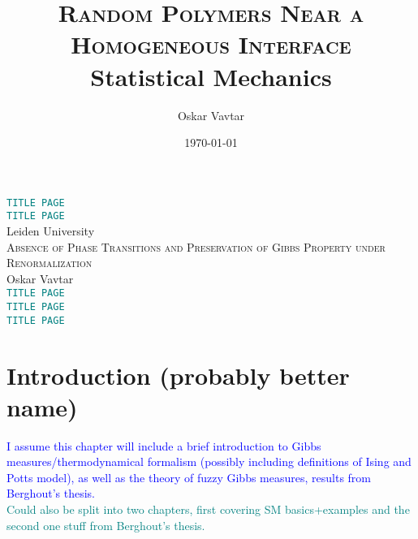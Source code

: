 \documentclass[12pt]{article}
\title{\textsc{Random Polymers Near a Homogeneous Interface}\\\vspace{0.3cm}\small{Statistical Mechanics}\vspace{-0.7cm}}
\author{Oskar Vavtar}
\date{\today}
\newcommand{\1}{\mathbbm{1}}
\newcommand{\5}{\vspace{0.5cm}}
\theoremstyle{definition}
\begin{document}
\begin{center}
\Huge{\textcolor{teal}{\texttt{TITLE PAGE}}} \\
\vspace{2cm}
\Huge{\textcolor{teal}{\texttt{TITLE PAGE}}} \\
\vspace{2cm}
Leiden University \\
\vspace{2cm}
{\textsc{Absence of Phase Transitions and Preservation of Gibbs Property under Renormalization}} \\
\vspace{2cm}
Oskar Vavtar \\
\vspace{2cm}
\Huge{\textcolor{teal}{\texttt{TITLE PAGE}}} \\
\vspace{2cm}
\Huge{\textcolor{teal}{\texttt{TITLE PAGE}}} \\
\vspace{2cm}
\Huge{\textcolor{teal}{\texttt{TITLE PAGE}}}
\end{center}
\pagebreak
\tableofcontents
\pagebreak


\section{Introduction (probably better name)}

\textcolor{blue}{I assume this chapter will include a brief introduction to Gibbs measures/thermodynamical formalism (possibly including definitions of Ising and Potts model), as well as the theory of fuzzy Gibbs measures, results from Berghout's thesis.}\\ 

\textcolor{teal}{Could also be split into two chapters, first covering SM basics+examples and the second one stuff from Berghout's thesis.}

\pagebreak

\end{document}
